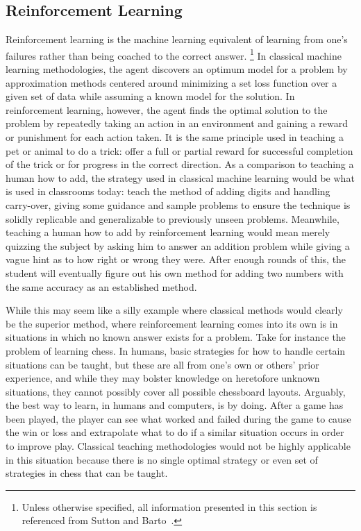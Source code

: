 \subsection{Reinforcement Learning}
\label{sec:intro-reinf}



Reinforcement learning is the machine learning equivalent of learning from one's
failures
rather than being coached to the correct answer.%
\footnote{
	Unless otherwise specified,
	all information presented in this section is referenced from
	Sutton and Barto~\cite{rl_book}.
}
%
In classical machine learning methodologies,
the agent discovers an optimum model for a problem by approximation methods
centered around minimizing a set loss function over a given set of data
while assuming a known model for the solution.
%
In reinforcement learning,
however,
the agent finds the optimal solution to the problem by repeatedly taking an
action in an environment and gaining a reward or punishment for each
action taken.
%
It is the same principle used in teaching a pet or animal to do a trick:
offer a full or partial reward for successful completion of the trick or
for progress in the correct direction.
%
As a comparison to teaching a human how to add,
the strategy used in classical machine learning would be what is used in
classrooms today:
teach the method of adding digits and handling carry-over,
giving some guidance and sample problems to ensure the technique is solidly
replicable and generalizable to previously unseen problems.
%
Meanwhile, teaching a human how to add by reinforcement learning would
mean merely quizzing the subject by asking him to answer an addition problem
while giving a vague hint as to how right or wrong they were.
%
After enough rounds of this,
the student will eventually figure out his own method for adding two numbers
with the same accuracy as an established method.

While this may seem like a silly example where classical methods would clearly
be the superior method,
where reinforcement learning comes into its own is in situations in which no
known answer exists for a problem.
%
Take for instance the problem of learning chess.
%
In humans,
basic strategies for how to handle certain situations can be taught,
but these are all from one's own or others' prior experience,
and while they may bolster knowledge on heretofore unknown situations,
they cannot possibly cover all possible chessboard layouts.
%
Arguably, the best way to learn, in humans and computers, is by doing.
%
%
After a game has been played,
the player can see what worked and failed during the game to cause the win or
loss and extrapolate what to do if a similar situation occurs in order to
improve play.
%
Classical teaching methodologies would not be highly applicable in this
situation because there is no single optimal strategy
or even set of strategies
in chess that can be taught.


